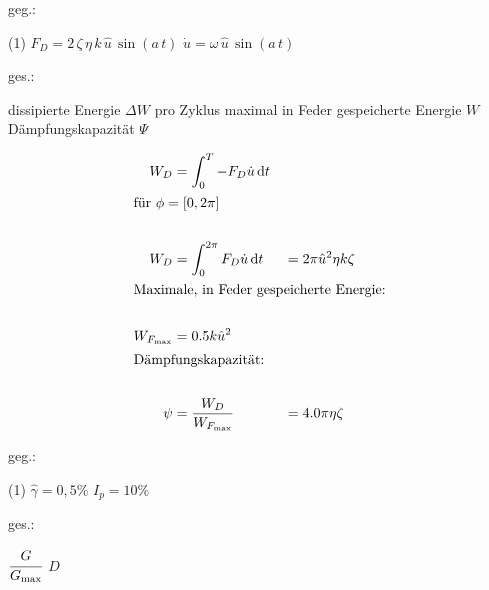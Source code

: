 \begin{questions}
    \vspace{1em}

        \begin{minipage}[t]{.49\linewidth}
        geg.:
            \begin{tasks} (1)
                \task[] $F_D = 2\, \zeta\, \eta\, k\, \hat u\, \sin(a\, t)$
                \task[] $\dot{u} = \omega\,\hat u\, \sin(a\,t)$
            \end{tasks}
        \end{minipage}
        \begin{minipage}[t]{.49\linewidth}
        ges.:
            \begin{tasks}
                \task[] dissipierte Energie $\Delta W$ pro Zyklus
                \task[] maximal in Feder gespeicherte Energie $W$
                \task[] Dämpfungskapazität $\Psi$
            \end{tasks}
        \end{minipage}
    \vspace{1cm}

    \begin{solution}
        \begin{align*}
            W_D &= \int_{0}^{T} -F_D \dot{u} \dd{t}\\
            \intertext{für $\phi = [0, 2\pi]$} \\
            W_D &= \int_{0}^{2 \pi} F_D \dot{u} \dd{t} &&= 2 \pi \hat{u}^2 \eta k \zeta\\
            \intertext{Maximale, in Feder gespeicherte Energie:} \\
            W_{F_{\max}} &= 0.5 k \hat{u}^2 \\
            \intertext{Dämpfungskapazität:} \\
            \psi &= \frac{W_D}{W_{F_{\max}}} &&= 4.0 \pi \eta \zeta \\
        \end{align*}
    \end{solution}


    \vspace{1em}

    \begin{minipage}[t]{.49\linewidth}
    geg.:
        \begin{tasks} (1)
            \task[] $\hat\gamma = 0,5\%$
            \task[] $I_p = 10 \%$
        \end{tasks}
    \end{minipage}
    \begin{minipage}[t]{.49\linewidth}
    ges.:
        \begin{tasks}
            \task[] $\cfrac{G}{G_{\max}}$
            \task[] $D$
        \end{tasks}
    \end{minipage}


\end{questions}
